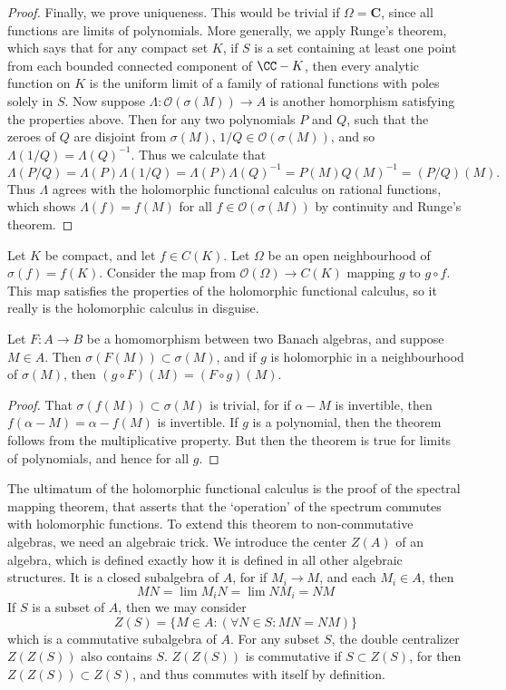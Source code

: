 \begin{proof}
    Finally, we prove uniqueness. This would be trivial if $\Omega = \mathbf{C}$, since all functions are limits of polynomials. More generally, we apply Runge's theorem, which says that for any compact set $K$, if $S$ is a set containing at least one point from each bounded connected component of $\CC - K$, then every analytic function on $K$ is the uniform limit of a family of rational functions with poles solely in $S$. Now suppose $\Lambda: \mathcal{O}(\sigma(M)) \to A$ is another homorphism satisfying the properties above. Then for any two polynomials $P$ and $Q$, such that the zeroes of $Q$ are disjoint from $\sigma(M)$, $1/Q \in \mathcal{O}(\sigma(M))$, and so $\Lambda(1/Q) = \Lambda(Q)^{-1}$. Thus we calculate that
    \[ \Lambda(P/Q) = \Lambda(P) \Lambda(1/Q) = \Lambda(P) \Lambda(Q)^{-1} = P(M) Q(M)^{-1} = (P/Q)(M). \]
    Thus $\Lambda$ agrees with the holomorphic functional calculus on rational functions, which shows $\Lambda(f) = f(M)$ for all $f \in \mathcal{O}(\sigma(M))$ by continuity and Runge's theorem.
\end{proof}

\begin{example}
    Let $K$ be compact, and let $f \in C(K)$. Let $\Omega$ be an open neighbourhood of $\sigma(f) = f(K)$. Consider the map from $\mathcal{O}(\Omega) \to C(K)$ mapping $g$ to $g \circ f$. This map satisfies the properties of the holomorphic functional calculus, so it really is the holomorphic calculus in disguise.
\end{example}

\begin{theorem}
    Let $F: A \to B$ be a homomorphism between two Banach algebras, and suppose $M \in A$. Then $\sigma(F(M)) \subset \sigma(M)$, and if $g$ is holomorphic in a neighbourhood of $\sigma(M)$, then $(g \circ F)(M) = (F \circ g)(M)$.
\end{theorem}
\begin{proof}
    That $\sigma(f(M)) \subset \sigma(M)$ is trivial, for if $\alpha - M$ is invertible, then $f(\alpha - M) = \alpha - f(M)$ is invertible. If $g$ is a polynomial, then the theorem follows from the multiplicative property. But then the theorem is true for limits of polynomials, and hence for all $g$.
\end{proof}

The ultimatum of the holomorphic functional calculus is the proof of the spectral mapping theorem, that asserts that the `operation' of the spectrum commutes with holomorphic functions. To extend this theorem to non-commutative algebras, we need an algebraic trick. We introduce the center $Z(A)$ of an algebra, which is defined exactly how it is defined in all other algebraic structures. It is a closed subalgebra of $A$, for if $M_i \to M$, and each $M_i \in A$, then
%
\[ MN = \lim M_iN = \lim NM_i = NM \]
%
If $S$ is a subset of $A$, then we may consider
%
\[ Z(S) = \{ M \in A : (\forall N \in S: MN = NM) \} \]
%
which is a commutative subalgebra of $A$. For any subset $S$, the double centralizer $Z(Z(S))$ also contains $S$. $Z(Z(S))$ is commutative if $S \subset Z(S)$, for then $Z(Z(S)) \subset Z(S)$, and thus commutes with itself by definition.

